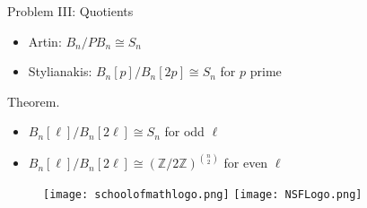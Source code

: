 \documentclass[final]{beamer}
\newcommand{\Z}{\mathbb{Z}}
\newlength{\sepwidth}
\newlength{\colwidth}
\newcommand{\separatorcolumn}{\begin{column}{\sepwidth}\end{column}}
\begin{document}
\begin{frame}[t]
\begin{columns}[t]
\begin{column}{\colwidth}
\begin{block}{
  \begin{huge}
  \vspace*{5mm} 
    Problem III:   Quotients
  \end{huge}}
\vspace*{-7mm}
\begin{huge}
  \begin{itemize}
  \item[] Artin: $B_n / PB_n \cong S_n$
  
  \item[] Stylianakis: $B_n[p] / B_n[2p] \cong S_n$ for $p$ prime 
  \end{itemize}
    \end{huge} \vspace*{-7mm}

{\bf{ \begin{huge} Theorem. \end{huge}} }
\begin{huge}
\vspace*{-7mm}
\begin{itemize} 
\item[] $B_n[\ell] / B_n[2\ell] \cong S_n$ for odd $\ell$

        
\item[] $B_n[\ell] / B_n[2\ell] \cong (\Z /2\Z)^{{n\choose 2}}$ for even $\ell$
  
\end{itemize}
\end{huge}

  \end{block} 
\begin{Large}

 



  
  


   
  
\end{Large}


\begin{figure}
    \texttt{[image: schoolofmathlogo.png]}
\hspace{1cm}
    \texttt{[image: NSFLogo.png]}
\end{figure} 

\end{column}

\separatorcolumn
\end{columns}
\end{frame}
\end{document}
